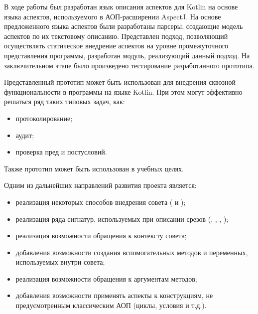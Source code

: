 \conclusion
В ходе работы был разработан язык описания аспектов для Kotlin на основе языка аспектов, используемого в АОП-расширении AspectJ.
На основе предложенного языка аспектов были разработаны парсеры, создающие модель аспектов по их текстовому описанию.
Представлен подход, позволяющий осуществлять статическое внедрение аспектов на уровне промежуточного представления программы, разработан модуль, реализующий данный подход.
На заключительном этапе было произведено тестирование разработанного прототипа.

Представленный прототип может быть использован для внедрения сквозной функциональности в программы на языке Kotlin.
При этом могут эффективно решаться ряд таких типовых задач, как:
\begin{itemize}
	\item протоколирование;
	\item аудит;
	\item проверка пред и постусловий.
\end{itemize}
Также прототип может быть использован в учебных целях.

Одним из дальнейших направлений развития проекта является:
\begin{itemize}
	\item реализация некоторых способов внедрения совета ( и );
	\item реализация ряда сигнатур, используемых при описании срезов (, , , );
	\item реализация возможности обращения к контексту совета;
	\item добавления возможности создания вспомогательных методов и переменных, используемых внутри совета;
	\item реализация возможности обращения к аргументам методов;
	\item добавления возможности применять аспекты к конструкциям, не предусмотренным классическим АОП (циклы, условия и т.д.).
\end{itemize}

